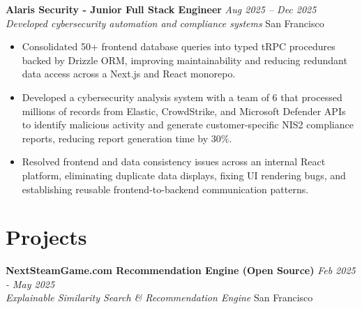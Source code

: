 \documentclass[a4paper,11pt]{article}
\newcommand{\resumeSubheading}[4]{%
\vspace{1mm}
\textbf{#1} \hfill \textit{\footnotesize #4} \\
\textit{\footnotesize #3} \hfill \footnotesize #2
\vspace{1mm}
}
\begin{document}
\vspace{-3mm}

\resumeSubheading
{Alaris Security - Junior Full Stack Engineer}{San Francisco}
{Developed cybersecurity automation and compliance systems}{Aug 2025 -- Dec 2025}
\vspace{-3mm}

\begin{itemize}[leftmargin=0.35in, itemsep=0.5mm]

\item Consolidated 50+ frontend database queries into typed tRPC procedures backed by Drizzle ORM, improving maintainability and reducing redundant data access across a Next.js and React monorepo.

\vspace{-.45mm}
\item Developed a cybersecurity analysis system with a team of 6 that processed millions of records from Elastic, CrowdStrike, and Microsoft Defender APIs to identify malicious activity and generate customer-specific NIS2 compliance reports, reducing report generation time by 30\%.

\vspace{-.45mm}

\item Resolved frontend and data consistency issues across an internal React platform, eliminating duplicate data displays, fixing UI rendering bugs, and establishing reusable frontend-to-backend communication patterns.

\end{itemize}

\vspace{-8.5mm}

\section{\textbf{Projects}}

\resumeSubheading
{NextSteamGame.com Recommendation Engine (Open Source)}{San Francisco}
{Explainable Similarity Search \& Recommendation Engine}{Feb 2025 - May 2025}
\vspace{-4mm}
\end{document}
